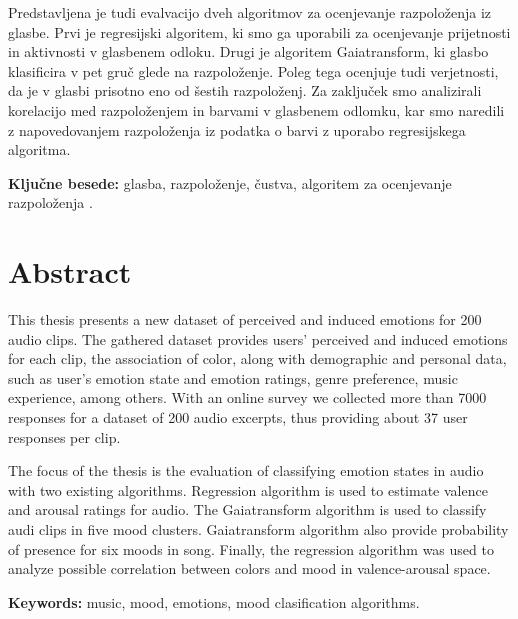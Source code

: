 \documentclass[a4paper, 12pt]{book}
\newcommand{\tkeywords}{glasba, razpoloženje, čustva, algoritem za ocenjevanje razpoloženja }
\newcommand{\tkeywordsEn}{music, mood, emotions,  mood clasification algorithms}
\newcommand{\clearemptydoublepage}{\newpage{\pagestyle{empty}\cleardoublepage}}
\begin{document}
{Predstavljena je tudi evalvacijo dveh algoritmov za ocenjevanje razpoloženja iz glasbe. Prvi je regresijski algoritem, ki smo ga uporabili za ocenjevanje prijetnosti in aktivnosti v glasbenem odloku. Drugi je algoritem Gaiatransform, ki glasbo klasificira v pet gruč glede na razpoloženje. Poleg tega ocenjuje tudi verjetnosti, da je v glasbi prisotno eno od šestih razpoloženj. Za zaključek smo analizirali korelacijo med razpoloženjem in barvami v glasbenem odlomku, kar smo naredili z napovedovanjem razpoloženja iz podatka o barvi z uporabo regresijskega algoritma.  


\bigskip

\noindent\textbf{Ključne besede:} \tkeywords.
\clearemptydoublepage

\chapter*{Abstract}

This thesis presents a new dataset of perceived and induced emotions for 200 audio clips. The gathered dataset provides users' perceived and induced emotions for each clip, the association of color, along with demographic and personal data, such as user's emotion state and emotion ratings, genre preference, music experience, among others. With an online survey we collected more than 7000 responses for a dataset of 200 audio excerpts, thus providing about 37 user responses per clip.

The focus of the thesis is the evaluation of classifying emotion states in audio with two existing algorithms.  Regression algorithm is used to estimate valence and arousal ratings for audio. The Gaiatransform algorithm is used to classify audi clips in five mood clusters. Gaiatransform algorithm also provide probability of presence for six moods in song. Finally, the regression algorithm was used to analyze possible correlation between colors and mood in valence-arousal space.

 

\bigskip

\noindent\textbf{Keywords:} \tkeywordsEn.
\clearemptydoublepage

\mainmatter
\setcounter{page}{1}
\pagestyle{fancy}

}
\end{document}
